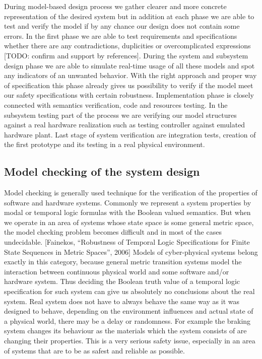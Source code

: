 \documentclass[english,technical,10pt]{FITreport}[2018/01/26]
\begin{document}
During model-based design process we gather clearer and more concrete representation of the desired system but in addition at each phase we are able to test and verify the model if by any chance our design does not contain some errors. In the first phase we are able to test requirements and specifications whether there are any contradictions, duplicities or overcomplicated expressions [TODO: confirm and support by references]. During the system and subsystem design phase we are able to simulate real-time usage of all these models and spot any indicators of an unwanted behavior. With the right approach and proper way of specification this phase already gives us possibility to verify if the model meet our safety specifications with certain robustness. Implementation phase is closely connected with semantics verification, code and resources testing. In the subsystem testing part of the process we are verifying our model structures against a real hardware realization such as testing controller against emulated hardware plant. Last stage of system verification are integration tests, creation of the first prototype and its testing in a real physical environment.

\subsection{Model checking of the system design}

Model checking is generally used technique for the verification of the properties of software and hardware systems. Commonly we represent a system properties by modal or temporal logic formulas with the Boolean valued semantics. But when we operate in an area of systems whose state space is some general metric space, the model checking problem becomes difficult and in most of the cases undecidable. [Fainekos, “Robustness of Temporal Logic Specifications for Finite State Sequences in Metric Spaces”, 2006] Models of cyber-physical systems belong exactly in this category, because general metric transition systems model the interaction between continuous physical world and some software and/or hardware system. Thus deciding the Boolean truth value of a temporal logic specification for such system can give us absolutely no conclusions about the real system. Real system does not have to always behave the same way as it was designed to behave, depending on the environment influences and actual state of a physical world, there may be a delay or randomness. For example the braking system changes its behaviour as the materials which the system consists of are changing their properties. This is a very serious safety issue, especially in an area of systems that are to be as safest and reliable as possible.
\end{document}
